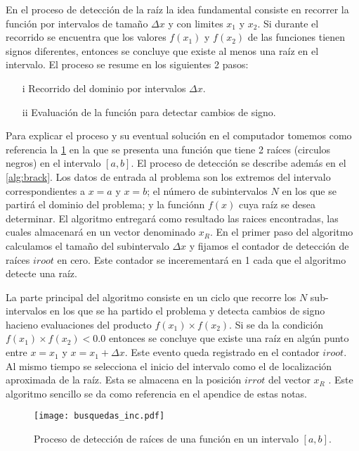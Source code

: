 En el proceso de detección de la raíz la idea fundamental consiste en recorrer la función por intervalos de tamaño $\Delta x$ y con limites $x_1$ y $x_2$. Si durante el recorrido se encuentra que los valores $f(x_1)$ y $f(x_2)$ de las funciones tienen signos diferentes, entonces se concluye que existe al menos una raíz en el intervalo. El proceso se resume en los siguientes 2 pasos:

\begin{itemize}
	\item[i]  Recorrido del dominio por intervalos $\Delta x$.
	\item[ii] Evaluación de la función para detectar cambios de signo.
\end{itemize}

Para explicar el proceso y su eventual solución en el computador tomemos como referencia la \cref{fig:bracketing} en la que se presenta una función que tiene 2 raíces (circulos negros) en el intervalo $[a,b]$. El proceso de detección se describe además en el \cref{alg:brack}. Los datos de entrada al problema son los extremos del intervalo correspondientes a $x=a$ y $x=b$; el número de subintervalos $N$ en los que se partirá el dominio del problema; y la funciónn $f(x)$ cuya raíz se desea determinar.  El algoritmo entregará como resultado las raices encontradas, las cuales almacenará en un vector denominado $x_R$. En el primer paso del algoritmo calculamos el tamaño del subintervalo $\Delta x$ y fijamos el contador de detección de raíces $iroot$ en cero. Este contador se incerementará en 1 cada que el algoritmo detecte una raíz.

La parte principal del algoritmo consiste en un ciclo que recorre los $N$ sub-intervalos en los que se ha partido el problema y detecta cambios de signo hacieno evaluaciones del producto $f (x_1) \times f (x_2).$ Si se da la condición $f \left( x_1 \right) \times f \left( x_2 \right) < 0.0$ entonces se concluye que existe una raíz en algún punto entre $x=x_1$ y $x=x_1+ \Delta x$. Este evento queda registrado en el contador $iroot$. Al mismo tiempo se selecciona el inicio del intervalo como el de localización aproximada de la raíz. Esta se almacena en la posición $irrot$ del vector $x_R$ . Este algoritmo sencillo se da como referencia en el apendice de estas notas.

\begin{figure}[H]
\centering
\texttt{[image: busquedas\_inc.pdf]}
\caption{Proceso de detección de raíces de una función en un intervalo $[a,b]$.}
\label{fig:bracketing}
\end{figure}



